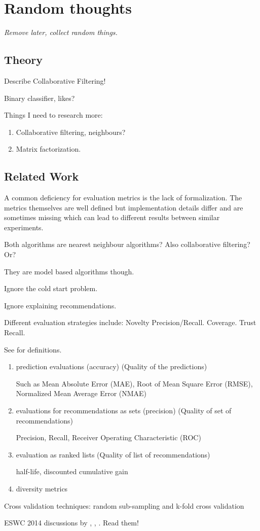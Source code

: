 \chapter{Random thoughts}

\textit{Remove later, collect random things.}


\section{Theory}

Describe Collaborative Filtering!

Binary classifier, likes?

Things I need to research more:

\begin{enumerate}
    \item Collaborative filtering, neighbours? \cite{hu2008collaborative}
    \item Matrix factorization.
\end{enumerate}

\section{Related Work}

A common deficiency for evaluation metrics is the lack of formalization. The metrics themselves are well defined but implementation details differ and are sometimes missing which can lead to different results between similar experiments.


Both algorithms are nearest neighbour algorithms? Also collaborative filtering? Or?

They are model based algorithms though.

Ignore the cold start problem.

Ignore explaining recommendations.

Different evaluation strategies include: Novelty Precision/Recall. Coverage. Trust Recall.

See \citep{bobadilla2013recommender} for definitions.

\begin{enumerate}
    \item prediction evaluations (accuracy) (Quality of the predictions)

        Such as Mean Absolute Error (MAE), Root of Mean Square Error (RMSE), Normalized Mean Average Error (NMAE)

    \item evaluations for recommendations as sets (precision) (Quality of set of recommendations)

        Precision, Recall, Receiver Operating Characteristic (ROC)

    \item evaluation as ranked lists (Quality of list of recommendations)

        half-life, discounted cumulative gain

    \item diversity metrics
\end{enumerate}

Cross validation techniques:
    random sub-sampling and k-fold cross validation

ESWC 2014 discussions by \citep{di2014linked}, \citep{heitmann2014semstim}, \citep{ostuni2014linked}. Read them!


